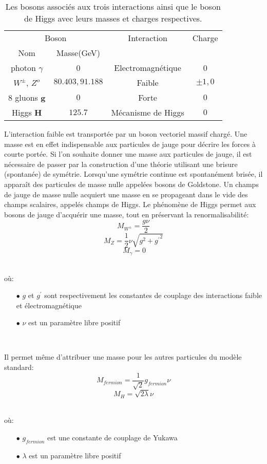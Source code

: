 \makeatletter
\setlength{\@fptop}{5pt}
\begin{table}[h!]
  \centering
  \begin{tabular}{|c|c|c|c|}
    \hline   \multicolumn{2}{|c|}{Boson} & Interaction & Charge  \\
    \cline{1-2} Nom & Masse(GeV) &  & \\
    \hline 
    photon \boldmath$\gamma$ & 0 & Electromagn\'etique & 0 \\
    \boldmath$W^{\pm}$, \boldmath$Z^{o}$ & $80.403 , 91.188$ & Faible & $\pm1,0$ \\
    8 gluons \bf{g} & $0$ & Forte & $0$ \\
    Higgs \bf{H} & $125.7$ & M\'ecanisme de Higgs & $0$ \\
    \hline    
  \end{tabular}
  \caption{Les bosons associ\'es aux trois interactions ainsi que le boson de Higgs avec leurs masses et charges respectives.}
  \label{table:1.2}
\end{table}


L'interaction faible est transport\'ee par un boson vectoriel massif charg\'e. Une masse est en effet indispensable aux particules de jauge pour d\'ecrire les forces \`a courte port\'ee. Si l'on souhaite donner une masse aux particules de jauge, il est n\'ecessaire de passer par la construction d'une th\'eorie utilisant une brisure (spontan\'ee) de sym\'etrie. Lorsqu'une sym\'etrie continue est spontan\'ement bris\'ee, il appara\^it des particules de masse nulle appel\'ees bosons de Goldstone. Un champs de jauge de masse nulle acquiert une masse en se propageant dans le vide des champs scalaires, appel\'es champs de Higgs. Le ph\'enom\`ene de Higgs permet aux bosons de jauge d'acqu\'erir une masse, tout en pr\'eservant la renormalisabilit\'e: 
$$M_{W^{\pm}}=\frac{g\nu}{2}$$
$$M_{Z}=\frac{1}{2}\nu\sqrt{g^2+{g^\prime}^2}$$
$$\ M_{\gamma}=0$$
~\par o\`u:
\begin{itemize}
  \item[$\bullet$] $g$ et $g^\prime$ sont respectivement les constantes de couplage des interactions faible et \'electromagn\'etique
  \item[$\bullet$] $\nu$ est un param\`etre libre positif
\end{itemize}
~\par Il permet m\^eme d'attribuer une masse pour les autres particules du mod\`ele standard: 
$$M_{fermion}=\frac{1}{\sqrt{2}}g_{fermion}\nu$$ 
$$M_{H}=\sqrt{2{\lambda}}\nu$$
~\par o\`u:
\begin{itemize}
  \item[$\bullet$] $g_{fermion}$ est une constante de couplage de Yukawa
  \item[$\bullet$] $\lambda$ est un param\`etre libre positif
\end{itemize}

